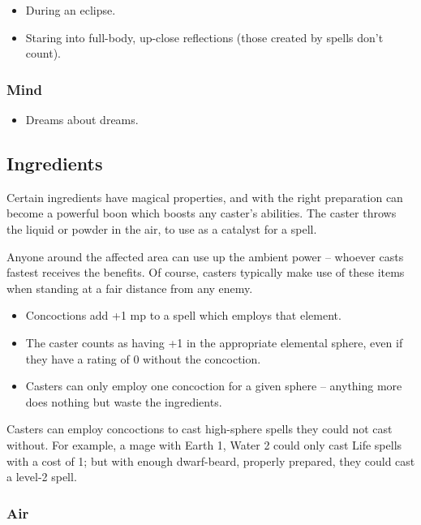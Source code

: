 \begin{multicols}{2}
\begin{itemize}
  \item
  During an eclipse.
  \item
  Staring into full-body, up-close reflections (those created by spells don't count).
\end{itemize}

\subsubsection{Mind}

\begin{itemize}
  \item
  Dreams about dreams.
\end{itemize}

\subsection{Ingredients}
\label{magicIngredients}

Certain ingredients have magical properties, and with the right preparation can become a powerful \gls{boon} which boosts any caster's abilities.
The caster throws the liquid or powder in the air, to use as a catalyst for a spell.

Anyone around the affected area can use up the ambient power -- whoever casts fastest receives the benefits.
Of course, casters typically make use of these items when standing at a fair distance from any enemy.

\begin{itemize}
  \item
  Concoctions add +1 \gls{mp} to a spell which employs that element.
  \item
  The caster counts as having +1 in the appropriate elemental sphere, even if they have a rating of 0 without the concoction.
  \item
  Casters can only employ one concoction for a given sphere -- anything more does nothing but waste the \glspl{ingredient}.
\end{itemize}

Casters can employ concoctions to cast high-sphere spells they could not cast without.
For example, a mage with Earth 1, Water 2 could only cast Life spells with a cost of 1; but with enough dwarf-beard, properly prepared, they could cast a level-2 spell.

\subsubsection{Air}


\end{multicols}
